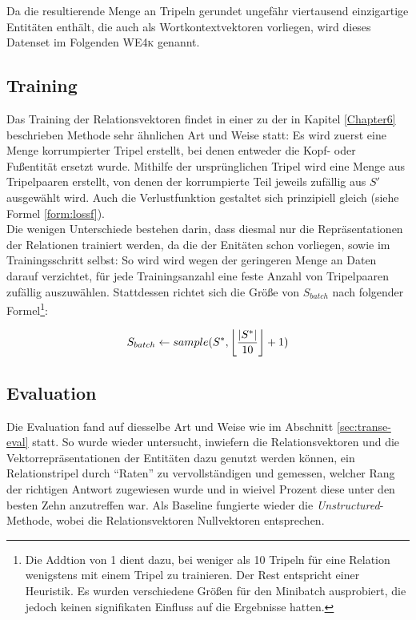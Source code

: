 Da die resultierende Menge an Tripeln gerundet ungefähr viertausend einzigartige Entitäten enthält, die auch als
Wortkontextvektoren vorliegen, wird dieses Datenset im Folgenden \textsc{WE4k} genannt.

\subsection{Training}

Das Training der Relationsvektoren findet in einer zu der in Kapitel \ref{Chapter6} beschrieben Methode sehr
ähnlichen Art und Weise statt: Es wird zuerst eine Menge korrumpierter Tripel erstellt, bei denen entweder
die Kopf- oder Fußentität ersetzt wurde.
Mithilfe der ursprünglichen Tripel wird eine Menge aus Tripelpaaren erstellt, von denen der korrumpierte Teil jeweils
zufällig aus $S'$ ausgewählt wird. Auch die Verlustfunktion gestaltet sich prinzipiell gleich (siehe Formel \ref{form:lossf}).\\

Die wenigen Unterschiede bestehen darin, dass diesmal nur die Repräsentationen der Relationen trainiert werden,
da die der Enitäten schon vorliegen, sowie im Trainingsschritt selbst: So wird wird wegen der geringeren Menge an
Daten darauf verzichtet, für jede Trainingsanzahl eine feste Anzahl von Tripelpaaren zufällig auszuwählen.
Stattdessen richtet sich die Größe von $S_{batch}$ nach folgender Formel\footnote{Die Addtion von 1 dient dazu, bei weniger
als 10 Tripeln für eine Relation wenigstens mit einem Tripel zu trainieren. Der Rest entspricht einer Heuristik. Es wurden
verschiedene Größen für den Minibatch ausprobiert, die jedoch keinen signifikaten Einfluss auf die Ergebnisse hatten.}:

\begin{equation}
  S_{batch} \leftarrow sample(S^*, \floor*{\frac{|S^*|}{10}}+1)
\end{equation}

\subsection{Evaluation}

Die Evaluation fand auf diesselbe Art und Weise wie im Abschnitt \ref{sec:transe-eval} statt. So wurde wieder untersucht,
inwiefern die Relationsvektoren und die Vektorrepräsentationen der Entitäten dazu genutzt werden können, ein Relationstripel
durch ``Raten'' zu vervollständigen und gemessen, welcher Rang der richtigen Antwort zugewiesen wurde und in wieivel Prozent
diese unter den besten Zehn anzutreffen war. Als Baseline fungierte wieder die \emph{Unstructured}-Methode, wobei die Relationsvektoren
Nullvektoren entsprechen.

